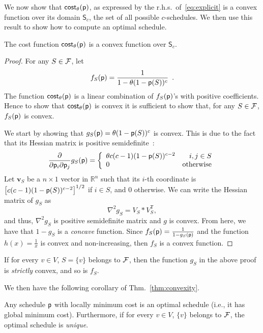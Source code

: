 We now show that $\mathsf{cost}_\theta(\mathsf{p})$, as expressed by the
r.h.s.~of~\eqref{eq:explicit} is a convex function over its domain
$\mathsf{S}_c$, the set of all possible $c$-schedules. We then use this result
to show how to compute an optimal schedule.

\begin{theorem}\label{thm:convexity}
	The cost function $\mathsf{cost}_\theta(\mathsf{p})$ is a convex function over
	$\mathsf{S}_c$.
\end{theorem}
\begin{proof}
	For any $S\in\mathcal{F}$, let
	\[
		f_S(\mathsf{p}) = \frac{1}{1 - \theta(1-\mathsf{p}(S))^c}\enspace.
	\]
	The function $\mathsf{cost}_\theta(\mathsf{p})$ is a linear combination of
	$f_S(\mathsf{p})$'s with positive coefficients. Hence to show that
	$\mathsf{cost}_\theta(\mathsf{p})$ is convex it is sufficient to show that, for any
	$S\in\mathcal{F}$, $f_S(\mathsf{p})$ is convex.

	We start by showing that $g_S(\mathsf{p}) = \theta(1-\mathsf{p}(S))^c$ is convex.
	This is due to the fact that its Hessian matrix is positive
	semidefinite~\citep{BoydV04}:
	\[
		\frac{\partial}{\partial \mathsf{p}_i \partial \mathsf{p}_j} g_S(\mathsf{p})=\left\{
		\begin{array}{lr}
		\theta c(c-1) (1-\mathsf{p}(S))^{c-2} &  i,j \in S\\
		0 &  \text{otherwise}
		\end{array}
		\right.
	\]
	Let $\mathbf{v}_S$ be a $n\times 1$ vector in $\mathbb{R}^n$ such that its
	$i$-th coordinate is $\left[c(c-1) (1-\mathsf{p}(S))^{c-2} \right]^{1/2}$ if $i\in
	S$, and $0$ otherwise. We can write the Hessian matrix of $g_S$ as
	\[
		\nabla^2 g_S = V_S * V_S^\mathsf{T},
	\]
	and thus, $\nabla^2 g_S$ is positive semidefinite matrix and $g$ is convex.
	From here, we have that $1-g_S$ is a \emph{concave} function. Since
	$f_S(\mathsf{p})=\frac{1}{1-g_S(\mathsf{p})}$ and the function $h(x)=\frac{1}{x}$ is
	convex and non-increasing, then $f_S$ is a convex function.
\end{proof}

If for every $v\in V$, $S=\{v\}$ belongs to $\mathcal{F}$, then the
function $g_S$ in the above proof is \emph{strictly} convex, and so is $f_S$.

We then have the following corollary of Thm.~\ref{thm:convexity}.

\begin{corollary}\label{corol:convexity}
	Any schedule $\mathsf{p}$ with locally minimum cost is an optimal schedule
	(i.e., it has global minimum cost). Furthermore, if for every $v\in V$,
	$\{v\}$ belongs to $\mathcal{F}$, the optimal schedule is \emph{unique}.
\end{corollary}

